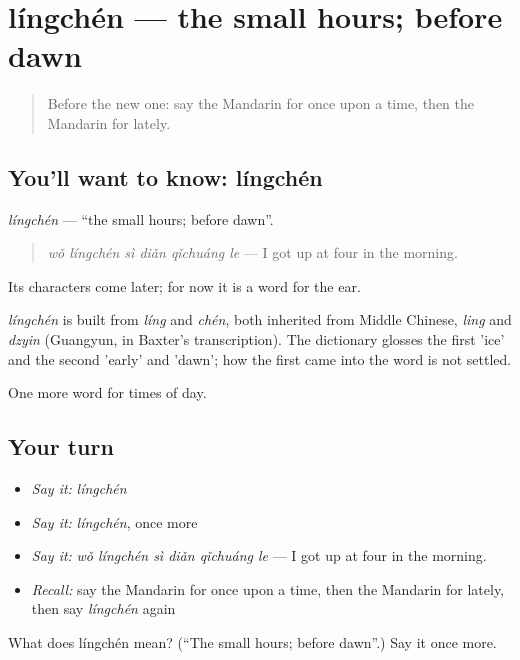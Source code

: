 \section[língchén]{língchén — the small hours; before dawn}

\label{lesson:ZH-C178-lingchen}



\begin{quote}
Before the new one: say the Mandarin for once upon a time, then the Mandarin for lately.
\end{quote}

\subsection*{You'll want to know: língchén}
\emph{língchén} — \textquotedblleft{}the small hours; before dawn\textquotedblright{}.

\begin{quote}
\emph{wǒ língchén sì diǎn qǐchuáng le} — I got up at four in the morning.
\end{quote}

Its characters come later; for now it is a word for the ear.

\begin{cousinweb}
\emph{língchén} is built from \emph{líng} and \emph{chén}, both inherited from Middle Chinese, \emph{ling} and \emph{dzyin} (Guangyun, in Baxter's transcription). The dictionary glosses the first 'ice' and the second 'early' and 'dawn'; how the first came into the word is not settled.
\end{cousinweb}

\begin{grammarlens}[title={What you've built}]
One more word for times of day.
\end{grammarlens}

\subsection*{Your turn}
\begin{itemize}
\raggedright
  \item \emph{Say it:} \emph{língchén}
  \item \emph{Say it:} \emph{língchén}, once more
  \item \emph{Say it:} \emph{wǒ língchén sì diǎn qǐchuáng le} — I got up at four in the morning.
  \item \emph{Recall:} say the Mandarin for once upon a time, then the Mandarin for lately, then say \emph{língchén} again
\end{itemize}

\begin{tcolorbox}[breakable,colback=teal!4,colframe=teal!35!black,title={Before you move on}]
What does língchén mean? (\textquotedblleft{}The small hours; before dawn\textquotedblright{}.) Say it once more.
\end{tcolorbox}
